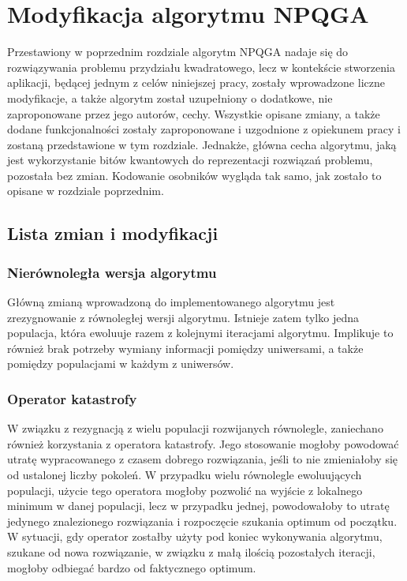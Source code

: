 \chapter{Modyfikacja algorytmu NPQGA}
\label{cha:modyfikacja}
Przestawiony w poprzednim rozdziale algorytm NPQGA nadaje się do rozwiązywania problemu przydziału kwadratowego, lecz w kontekście stworzenia aplikacji, będącej jednym z celów niniejszej pracy, zostały wprowadzone liczne modyfikacje, a także algorytm został uzupełniony o dodatkowe, nie zaproponowane przez jego autorów, cechy. Wszystkie opisane zmiany, a także dodane funkcjonalności zostały zaproponowane i uzgodnione z opiekunem pracy i zostaną przedstawione w tym rozdziale. Jednakże, główna cecha algorytmu, jaką jest wykorzystanie bitów kwantowych do reprezentacji rozwiązań problemu, pozostała bez zmian. Kodowanie osobników wygląda tak samo, jak zostało to opisane w rozdziale poprzednim.

\section{Lista zmian i modyfikacji}
\subsection{Nierównoległa wersja algorytmu}
Główną zmianą wprowadzoną do implementowanego algorytmu jest zrezygnowanie z równoległej wersji algorytmu. Istnieje zatem tylko jedna populacja, która ewoluuje razem z kolejnymi iteracjami algorytmu. Implikuje to również brak potrzeby wymiany informacji pomiędzy uniwersami, a także pomiędzy populacjami w każdym z uniwersów.

\subsection{Operator katastrofy}
W związku z rezygnacją z wielu populacji rozwijanych równolegle, zaniechano również korzystania z operatora katastrofy. Jego stosowanie mogłoby powodować utratę wypracowanego z czasem dobrego rozwiązania, jeśli to nie zmieniałoby się od ustalonej liczby pokoleń. W przypadku wielu równolegle ewoluujących populacji, użycie tego operatora mogłoby pozwolić na wyjście z lokalnego minimum w danej populacji, lecz w przypadku jednej, powodowałoby to utratę jedynego znalezionego rozwiązania i rozpoczęcie szukania optimum od początku. W sytuacji, gdy operator zostałby użyty pod koniec wykonywania algorytmu, szukane od nowa rozwiązanie, w związku z małą ilością pozostałych iteracji, mogłoby odbiegać bardzo od faktycznego optimum.

